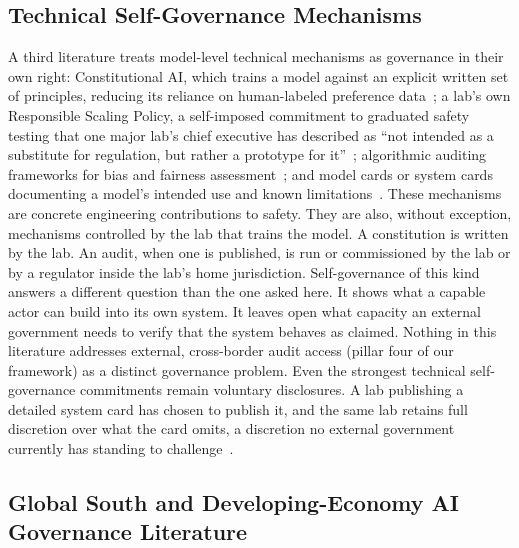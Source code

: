 \documentclass{ieeeaccess}
\begin{document}
\subsection{Technical Self-Governance Mechanisms}

A third literature treats model-level technical mechanisms as governance in their own right: Constitutional AI, which trains a model against an explicit written set of principles, reducing its reliance on human-labeled preference data~\cite{bai2022constitutional};
a lab's own Responsible Scaling Policy, a self-imposed commitment to graduated safety testing that one major lab's chief executive has described as ``not intended as a substitute for regulation, but rather a prototype for it''~\cite{amodei2023bletchley};
algorithmic auditing frameworks for bias and fairness assessment~\cite{raji2020closing,buolamwini2018gender,wachter2021bias};
and model cards or system cards documenting a model's intended use and known limitations~\cite{mitchell2019modelcards}.
These mechanisms are concrete engineering contributions to safety. They are also, without exception, mechanisms controlled by the lab that trains the model. A constitution is written by the lab. An audit, when one is published, is run or commissioned by the lab or by a regulator inside the lab's home jurisdiction. Self-governance of this kind answers a different question than the one asked here. It shows what a capable actor can build into its own system. It leaves open what capacity an external government needs to verify that the system behaves as claimed. Nothing in this literature addresses external, cross-border audit access (pillar four of our framework) as a distinct governance problem. Even the strongest technical self-governance commitments remain voluntary disclosures. A lab publishing a detailed system card has chosen to publish it, and the same lab retains full discretion over what the card omits, a discretion no external government currently has standing to challenge~\cite{mitchell2019modelcards}.

\subsection{Global South and Developing-Economy AI Governance Literature}
\end{document}
